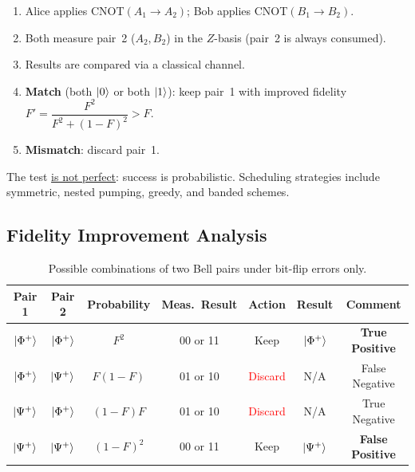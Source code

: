 \documentclass[10pt,a4paper]{article}
\begin{document}
\begin{tcolorbox}[algostyle, title={Algorithm}]
\begin{enumerate}[nosep]
  \item Alice applies CNOT$(A_1\!\to\!A_2)$;
        Bob applies CNOT$(B_1\!\to\!B_2)$.
  \item Both measure pair~2 ($A_2,B_2$) in the $Z$-basis
        (pair~2 is always consumed).
  \item Results are compared via a classical channel.
  \item \textbf{Match} (both $\ket{0}$ or both $\ket{1}$):
        keep pair~1 with improved fidelity
        $F'=\dfrac{F^2}{F^2+(1-F)^2}>F$.
  \item \textbf{Mismatch}: discard pair~1.
\end{enumerate}
\end{tcolorbox}

\noindent
The test \uline{is not perfect}: success is probabilistic.
Scheduling strategies include symmetric, nested pumping,
greedy, and banded schemes.

\subsection{Fidelity Improvement Analysis}

\begin{table}[H]
\centering
\caption{Possible combinations of two Bell pairs under bit-flip errors only.}
\begin{tabular}{ccccccc}
\toprule
\textbf{Pair 1} & \textbf{Pair 2} & \textbf{Probability} & \textbf{Meas.\ Result} & \textbf{Action} & \textbf{Result} & \textbf{Comment} \\
\midrule
$\ket{\Phi^+}$ & $\ket{\Phi^+}$ & $F^2$        & 00 or 11 & Keep                          & $\ket{\Phi^+}$ & \textbf{True Positive}  \\
$\ket{\Phi^+}$ & $\ket{\Psi^+}$ & $F(1-F)$     & 01 or 10 & \textcolor{red}{Discard}      & N/A            & False Negative          \\
$\ket{\Psi^+}$ & $\ket{\Phi^+}$ & $(1-F)F$     & 01 or 10 & \textcolor{red}{Discard}      & N/A            & True Negative           \\
$\ket{\Psi^+}$ & $\ket{\Psi^+}$ & $(1-F)^2$    & 00 or 11 & Keep                          & $\ket{\Psi^+}$ & \textbf{False Positive} \\
\bottomrule
\end{tabular}
\end{table}
\end{document}
